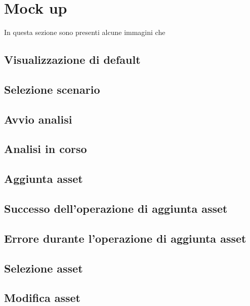 \newpage

\section{Mock up}
In questa sezione sono presenti alcune immagini che 

\subsection{Visualizzazione di default}
\label{0_Home}


\newpage
\subsection{Selezione scenario}
\label{1_Scenario}


\newpage
\subsection{Avvio analisi}
\label{2_Avvia_analisi}


\newpage
\subsection{Analisi in corso}
\label{3_Analisi_in_corso}

\newpage
\subsection{Aggiunta asset}
\label{4_Aggiungi_asset}


\newpage
\subsection{Successo dell'operazione di aggiunta asset}
\label{5_Aggiunta_effettuata}


\newpage
\subsection{Errore durante l'operazione di aggiunta asset}
\label{6_Aggiunta_asset_errore}


\newpage
\subsection{Selezione asset}


\newpage
\subsection{Modifica asset}
\label{8_Modifica_un_asset}


